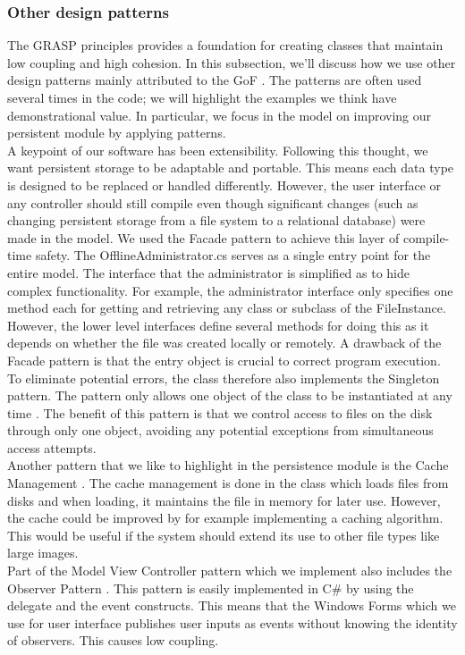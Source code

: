 \subsubsection{Other design patterns}
The GRASP principles provides a foundation for creating classes that maintain low coupling and high cohesion. In this subsection, we'll discuss how we use other design patterns mainly attributed to the GoF \cite[p.~342]{OOAD}. The patterns are often used several times in the code; we will highlight the examples we think have demonstrational value. In particular, we focus in the model on improving our persistent module by applying patterns.\\
\newline
A keypoint of our software has been extensibility. Following this thought, we want persistent storage to be adaptable and portable. This means each data type is designed to be replaced or handled differently. However, the user interface or any controller should still compile even though significant changes (such as changing persistent storage from a file system to a relational database) were made in the model. We used the Facade pattern to achieve this layer of compile-time safety. The OfflineAdministrator.cs serves as a single entry point for the entire model. The interface that the administrator is simplified as to hide complex functionality. For example, the administrator interface only specifies one method each for getting and retrieving any class or subclass of the FileInstance. However, the lower level interfaces define several methods for doing this as it depends on whether the file was created locally or remotely. 
A drawback of the Facade pattern is that the entry object is crucial to correct program execution. To eliminate potential errors, the class therefore also implements the Singleton pattern. The pattern only allows one object of the class to be instantiated at any time \cite[p.~348]{OOAD}. The benefit of this pattern is that we control access to files on the disk through only one object, avoiding any potential exceptions from simultaneous access attempts. \\
\newline
Another pattern that we like to highlight in the persistence module is the Cache Management \cite[p.~551]{OOAD}. The cache management is done in the class which loads files from disks and when loading, it maintains the file in memory for later use. However, the cache could be improved by for example implementing a caching algorithm. This would be useful if the system should extend its use to other file types like large images.\\
\newline
Part of the Model View Controller pattern which we implement also includes the Observer Pattern \cite[p.~377]{OOAD}. This pattern is easily implemented in C\# by using the delegate and the event constructs. This means that the Windows Forms which we use for user interface publishes user inputs as events without knowing the identity of observers. This causes low coupling. \\
\newpage